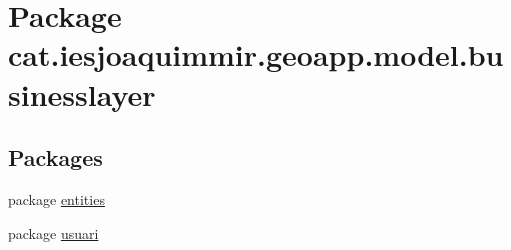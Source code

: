 \hypertarget{namespacecat_1_1iesjoaquimmir_1_1geoapp_1_1model_1_1businesslayer}{}\section{Package cat.\+iesjoaquimmir.\+geoapp.\+model.\+businesslayer}
\label{namespacecat_1_1iesjoaquimmir_1_1geoapp_1_1model_1_1businesslayer}
\subsection*{Packages}
\begin{DoxyCompactItemize}
\item 
package \mbox{\hyperlink{namespacecat_1_1iesjoaquimmir_1_1geoapp_1_1model_1_1businesslayer_1_1entities}{entities}}
\item 
package \mbox{\hyperlink{namespacecat_1_1iesjoaquimmir_1_1geoapp_1_1model_1_1businesslayer_1_1usuari}{usuari}}
\end{DoxyCompactItemize}
